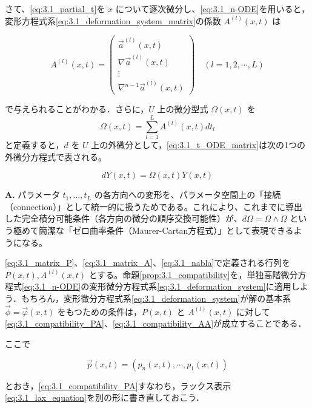さて、\eqref{eq:3.1_partial_t}を $x$ について逐次微分し、\eqref{eq:3.1_n-ODE}を用いると，変形方程式系\eqref{eq:3.1_deformation_system_matrix}の係数 $A^{(l)}(x,t)$ は

\begin{equation}\label{eq:3.1_matrix_A}
  A^{(l)}(x,t) =
  \begin{pmatrix}
    \vec{a}^{(l)}(x,t) \\[2mm]
    \nabla \vec{a}^{(l)}(x,t) \\
    \vdots \\
    \nabla^{n-1} \vec{a}^{(l)}(x,t)
  \end{pmatrix}
  \quad (l=1,2,\cdots,L)
\end{equation}

で与えられることがわかる．さらに，$U$ 上の微分型式 $\Omega(x,t)$ を
\[
  \Omega(x,t) = \sum_{l=1}^L A^{(l)}(x,t)dt_l
\]
と定義すると，$d$ を $U$ 上の外微分として，\eqref{eq:3.1_t_ODE_matrix}は次の1つの外微分方程式で表される。

\[
  dY(x,t) = \Omega(x,t)Y(x,t)
\]

\begin{Q}[複数の変形方程式を微分形式 $\Omega(x,t)$ を用いて $dY = \Omega Y$ と1つにまとめる幾何学的なメリットは何か？]
\textbf{A.} パラメータ $t_1, \dots, t_L$ の各方向への変形を、パラメータ空間上の「接続（connection）」として統一的に扱うためである。これにより、これまでに導出した完全積分可能条件（各方向の微分の順序交換可能性）が、$d\Omega = \Omega \wedge \Omega$ という極めて簡潔な「ゼロ曲率条件（Maurer-Cartan方程式）」として表現できるようになる。
\end{Q}

\eqref{eq:3.1_matrix_P}、\eqref{eq:3.1_matrix_A}、\eqref{eq:3.1_nabla}で定義される行列を $P(x,t), A^{(l)}(x,t)$ とする。命題\ref{prop:3.1_compatibility}を，単独高階微分方程式\eqref{eq:3.1_n-ODE}の変形微分方程式系\eqref{eq:3.1_deformation_system}に適用しよう．もちろん，変形微分方程式系\eqref{eq:3.1_deformation_system}が解の基本系 $\vec{\phi}=\vec{\varphi}(x,t)$ をもつための条件は，$P(x,t)$ と $A^{(l)}(x,t)$ に対して\eqref{eq:3.1_compatibility_PA}、\eqref{eq:3.1_compatibility_AA}が成立することである．

ここで

\begin{equation}\label{eq:3.1_p_vector}
  \vec{p}(x,t) = (p_n(x,t), \cdots, p_1(x,t))
\end{equation}

とおき，\eqref{eq:3.1_compatibility_PA}すなわち，ラックス表示\eqref{eq:3.1_lax_equation}を別の形に書き直しておこう．

